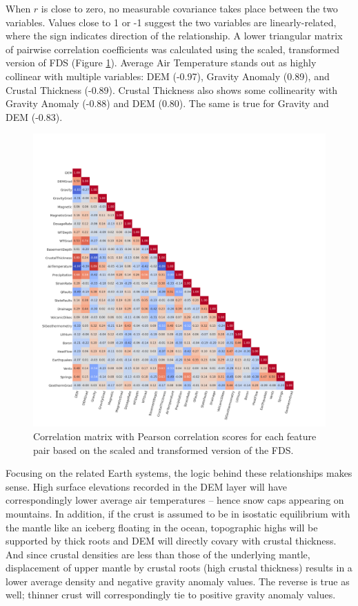 When $r$ is close to zero, no measurable covariance takes place between the two variables. Values close to 1 or -1 suggest the two variables are linearly-related, where the sign indicates direction of the relationship. A lower triangular matrix of pairwise correlation coefficients was calculated using the scaled, transformed version of FDS (Figure \ref{fig:corr_matrix}). Average Air Temperature stands out as highly collinear with multiple variables: DEM (-0.97), Gravity Anomaly (0.89), and Crustal Thickness (-0.89). Crustal Thickness also shows some collinearity with Gravity Anomaly (-0.88) and DEM (0.80). The same is true for Gravity and DEM (-0.83).

\begin{figure}[!htp]
\centering
\includegraphics[width=\textwidth]{templates/images/Figure-Scaled_Correlation_Matrix.png}
\caption[Feature correlation matrix]{Correlation matrix with Pearson correlation scores for each feature pair based on the scaled and transformed version of the FDS.}
\label{fig:corr_matrix}
\end{figure}

Focusing on the related Earth systems, the logic behind these relationships makes sense. High surface elevations recorded in the DEM layer will have correspondingly lower average air temperatures -- hence snow caps appearing on mountains. In addition, if the crust is assumed to be in isostatic equilibrium with the mantle like an iceberg floating in the ocean, topographic highs will be supported by thick roots and DEM will directly covary with crustal thickness. And since crustal densities are less than those of the underlying mantle, displacement of upper mantle by crustal roots (high crustal thickness) results in a lower average density and negative gravity anomaly values. The reverse is true as well; thinner crust will correspondingly tie to positive gravity anomaly values.  

